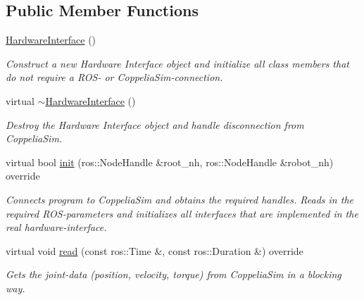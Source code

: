 \subsection*{Public Member Functions}
\begin{DoxyCompactItemize}
\item 
\mbox{\label{classcoppeliasim__interface_1_1HardwareInterface_a731c52969b54a2cdda78a494bcd878ee}} 
\hyperlink{classcoppeliasim__interface_1_1HardwareInterface_a731c52969b54a2cdda78a494bcd878ee}{Hardware\+Interface} ()
\begin{DoxyCompactList}\small\item\em Construct a new Hardware Interface object and initialize all class members that do not require a R\+O\+S-\/ or Coppelia\+Sim-\/connection. \end{DoxyCompactList}\item 
\mbox{\label{classcoppeliasim__interface_1_1HardwareInterface_a61047459c300ddd92e0b2d82e3b7c2e2}} 
virtual \hyperlink{classcoppeliasim__interface_1_1HardwareInterface_a61047459c300ddd92e0b2d82e3b7c2e2}{$\sim$\+Hardware\+Interface} ()
\begin{DoxyCompactList}\small\item\em Destroy the Hardware Interface object and handle disconnection from Coppelia\+Sim. \end{DoxyCompactList}\item 
virtual bool \hyperlink{classcoppeliasim__interface_1_1HardwareInterface_ada54343beeb383c43951877e3d49cf8e}{init} (ros\+::\+Node\+Handle \&root\+\_\+nh, ros\+::\+Node\+Handle \&robot\+\_\+nh) override
\begin{DoxyCompactList}\small\item\em Connects program to Coppelia\+Sim and obtains the required handles. Reads in the required R\+O\+S-\/parameters and initializes all interfaces that are implemented in the real hardware-\/interface. \end{DoxyCompactList}\item 
virtual void \hyperlink{classcoppeliasim__interface_1_1HardwareInterface_abc05d9a9e8761462b2161a33f55203cc}{read} (const ros\+::\+Time \&, const ros\+::\+Duration \&) override
\begin{DoxyCompactList}\small\item\em Gets the joint-\/data (position, velocity, torque) from Coppelia\+Sim in a blocking way. \end{DoxyCompactList}\item 

\end{DoxyCompactItemize}
